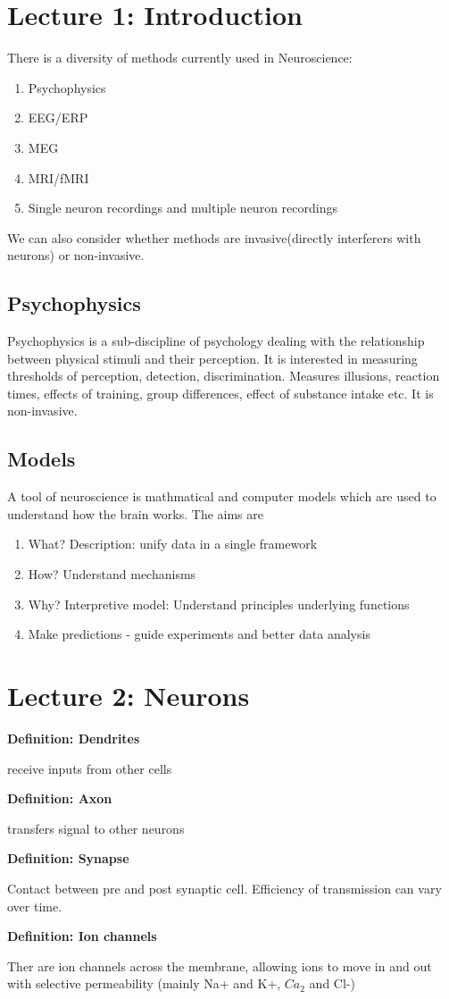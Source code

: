 \documentclass[11pt]{article}
\newcommand{\define}[2] {
  \textbf{Definition: #1}
  \begin{center} #2
\end{center}
}
\begin{document}
\section{Lecture 1: Introduction}

There is a diversity of methods currently used in Neuroscience:

\begin{enumerate}
\item Psychophysics
\item EEG/ERP
\item MEG
\item MRI/fMRI
\item Single neuron recordings and multiple neuron recordings
\end{enumerate}

We can also consider whether methods are invasive(directly interferers with neurons\cite{check}) or non-invasive. 

\subsection*{Psychophysics}
Psychophysics is a sub-discipline of psychology dealing with the relationship between physical stimuli and their perception. It is interested in measuring thresholds of perception, detection, discrimination. Measures illusions, reaction times, effects of training, group differences, effect of substance intake etc. It is non-invasive.  

\subsection*{Models}
A tool of neuroscience is mathmatical and computer models which are used to understand how the brain works. The aims are 

\begin{enumerate}
\item What? Description: unify data in a single framework
\item How? Understand mechanisms
\item Why? Interpretive model: Understand principles underlying functions
\item Make predictions - guide experiments and better data analysis
\end{enumerate}

\section{Lecture 2: Neurons}
\define{Dendrites}{receive inputs from other cells}
\define{Axon}{transfers signal to other neurons}
\define{Synapse}{Contact between pre and post synaptic cell. Efficiency of transmission can vary over time.}
\define{Ion channels}{Ther are ion channels across the membrane, allowing ions to move in and out with selective permeability (mainly Na+ and K+, $Ca_2$ and Cl-)}
\end{document}
